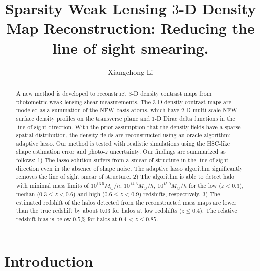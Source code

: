 \documentclass[twocolumn]{aastex62}
\begin{document}
\title{Sparsity Weak Lensing $3$-D Density Map Reconstruction:
Reducing the line of sight smearing.}
\author{Xiangchong Li}

\begin{abstract}
A new method is developed to reconstruct $3$-D density contrast maps from
photometric weak-lensing shear measurements. The $3$-D density contrast maps
are modeled as a summation of the NFW basis atoms, which have $2$-D multi-scale
NFW surface density profiles on the transverse plane and $1$-D Dirac delta
functions in the line of sight direction. With the prior assumption that the
density fields have a sparse spatial distribution, the density fields are
reconstructed using an oracle algorithm: adaptive lasso. Our method is tested
with realistic simulations using the HSC-like shape estimation error and
photo-$z$ uncertainty.  Our findings are summarized as follows: 1) The lasso
solution suffers from a smear of structure in the line of sight direction even
in the absence of shape noise. The adaptive lasso algorithm significantly
removes the line of sight smear of structure.  2) The algorithm is able to
detect halo with minimal mass limits of $10^{13.5} M_{\odot}/h$, $10^{14.3}
M_{\odot}/h$, $10^{15.0} M_{\odot}/h$ for the low ($z<0.3$), median ($0.3\leq
z< 0.6$) and high ($0.6\leq z< 0.9$) redshifts, respectively.  3) The estimated
redshift of the halos detected from the reconstructed mass maps are lower than
the true redshift by about $0.03$ for halos at low redshifts ($z\leq 0.4$). The
relative redshift bias is below $0.5\%$ for halos at $0.4<z\leq 0.85$.
\end{abstract}

\section{Introduction}
\end{document}
